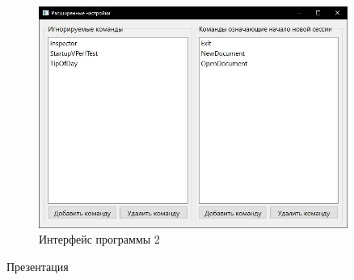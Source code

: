 \begin{figure}[h!]
\centering
\includegraphics[width=0.9\textwidth]{inc/img/interface2.jpg}
\caption{Интерфейс программы 2}
\label{interface2}
\end{figure}

%


\begin{center}
Презентация
\end{center}